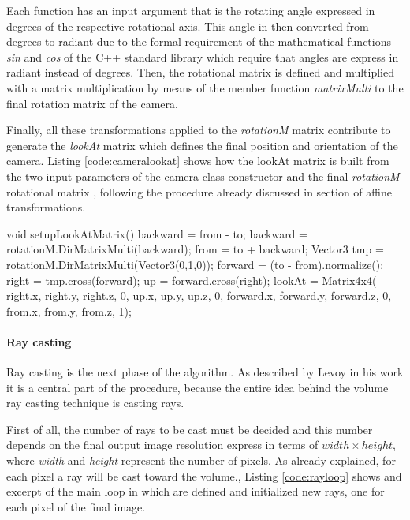 \documentclass[12pt,a4paper]{extarticle}
\newcommand{\linespace}{\vspace{8pt}}
\begin{document}
Each function has an input argument that is the rotating angle expressed in degrees of the respective rotational axis. This angle in then converted from degrees to radiant due to the formal requirement of the mathematical functions \textit{sin} and \textit{cos} of the C++ standard library which require that angles are express in radiant instead of degrees.
Then, the rotational matrix is defined and multiplied with a matrix multiplication by means of the member function \textit{matrixMulti} to the final rotation matrix of the camera.
\linespace

Finally, all these transformations applied to the \textit{rotationM} matrix contribute to generate the \textit{lookAt} matrix which defines the final position and orientation of the camera. Listing \ref{code:cameralookat} shows how the lookAt matrix is built from the two input parameters of the camera class constructor and the final \textit{rotationM} rotational matrix , following the procedure already discussed in section of affine transformations.

\begin{cpp}[caption={Camera class member function that build the lookAt transformation matrix, applying the final \textit{rotationM} matrix which group all the rotational transformation matrices. },label=code:cameralookat]
void setupLookAtMatrix() {
	backward = from - to;
	backward = rotationM.DirMatrixMulti(backward);
	from = to + backward;
	Vector3 tmp = rotationM.DirMatrixMulti(Vector3(0,1,0));
	forward = (to - from).normalize();
	right = tmp.cross(forward);
	up = forward.cross(right);
	lookAt = Matrix4x4(
		right.x, right.y, right.z, 0,
		up.x, up.y, up.z, 0,
		forward.x, forward.y, forward.z, 0,
		from.x, from.y, from.z, 1);
}
\end{cpp}

\paragraph{Ray casting} Ray casting is the next phase of the algorithm. As described by Levoy in his work \cite{levoy_1990:5} it is a central part of the procedure, because the entire idea behind the volume ray casting  technique is casting rays.

First of all, the number of rays to be cast must be decided and this number depends on the final output image resolution express in terms of $width \times height$, where \textit{width} and \textit{height} represent the number of pixels.
As already explained, for each pixel a ray will be cast toward the volume., Listing \ref{code:rayloop} shows and excerpt of the main loop in which are defined and initialized new rays, one for each pixel of the final image.
\end{document}
